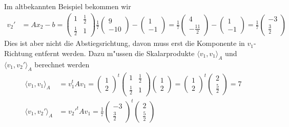 \begin{beispiel}
Im altbekannten Beispiel bekommen wir
\begin{align*}
v_2'&
=Ax_2-b
=\begin{pmatrix}1&\frac12\\\frac12&1\end{pmatrix}\frac17\begin{pmatrix}9\\-10\end{pmatrix}-\begin{pmatrix}1\\-1\end{pmatrix}
=\frac17\begin{pmatrix}4\\-\frac{11}2\end{pmatrix}
 -\begin{pmatrix}1\\-1\end{pmatrix}
=\frac17\begin{pmatrix}-3\\\frac32\end{pmatrix}
\end{align*}
Dies ist aber nicht die Abstiegsrichtung, davon muss erst die Komponente
in $v_1$-Richtung entfernt werden. Dazu m"ussen die Skalarprodukte
$\langle v_1,v_1\rangle_A$ und $\langle v_1,v_2'\rangle_A$ berechnet
werden
\begin{align*}
\langle v_1,v_1\rangle_A
&=
v_1^tAv_1
=
\begin{pmatrix}1\\2\end{pmatrix}^t
\begin{pmatrix}1&\frac12\\\frac12&1\end{pmatrix}
\begin{pmatrix}1\\2\end{pmatrix}
=
\begin{pmatrix}1\\2\end{pmatrix}^t
\begin{pmatrix}2\\\frac52\end{pmatrix}=7
\\
\langle v_1,v_2'\rangle_A
&=
v_2'^tAv_1=
\frac17
\begin{pmatrix}-3\\\frac32\end{pmatrix}^t
\begin{pmatrix}2\\\frac52\end{pmatrix}

\end{align*}
\end{beispiel}
